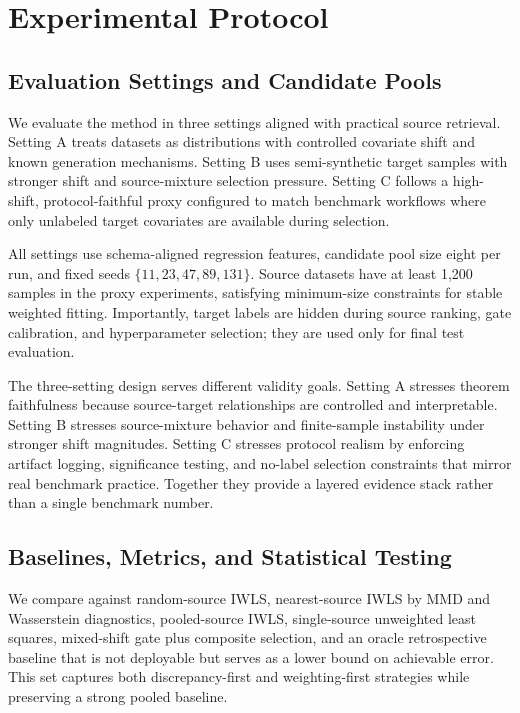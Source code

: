 \documentclass{article} %
\begin{document}
\section{Experimental Protocol}
\subsection{Evaluation Settings and Candidate Pools}
We evaluate the method in three settings aligned with practical source retrieval. Setting A treats datasets as distributions with controlled covariate shift and known generation mechanisms. Setting B uses semi-synthetic target samples with stronger shift and source-mixture selection pressure. Setting C follows a high-shift, protocol-faithful proxy configured to match benchmark workflows where only unlabeled target covariates are available during selection.

All settings use schema-aligned regression features, candidate pool size eight per run, and fixed seeds \(\{11,23,47,89,131\}\). Source datasets have at least 1{,}200 samples in the proxy experiments, satisfying minimum-size constraints for stable weighted fitting. Importantly, target labels are hidden during source ranking, gate calibration, and hyperparameter selection; they are used only for final test evaluation.

The three-setting design serves different validity goals. Setting A stresses theorem faithfulness because source-target relationships are controlled and interpretable. Setting B stresses source-mixture behavior and finite-sample instability under stronger shift magnitudes. Setting C stresses protocol realism by enforcing artifact logging, significance testing, and no-label selection constraints that mirror real benchmark practice. Together they provide a layered evidence stack rather than a single benchmark number.

\subsection{Baselines, Metrics, and Statistical Testing}
We compare against random-source IWLS, nearest-source IWLS by MMD and Wasserstein diagnostics, pooled-source IWLS, single-source unweighted least squares, mixed-shift gate plus composite selection, and an oracle retrospective baseline that is not deployable but serves as a lower bound on achievable error. This set captures both discrepancy-first and weighting-first strategies while preserving a strong pooled baseline.
\end{document}
